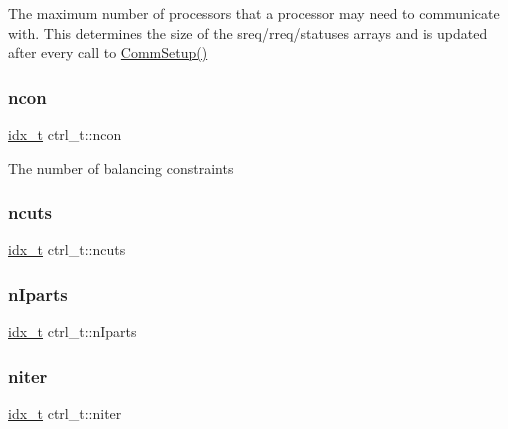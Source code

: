 The maximum number of processors that a processor may need to communicate with. This determines the size of the sreq/rreq/statuses arrays and is updated after every call to \hyperlink{libparmetis_2rename_8h_a8247e54e9e936d99c991d14d3f5ba03a}{Comm\+Setup()} \mbox{\label{structctrl__t_afb1fd1cb311eb4bcefa46a14ef05afa0}} 
\subsubsection{\texorpdfstring{ncon}{ncon}}
{\footnotesize\ttfamily \hyperlink{3rd_party_2parmetis-4_80_83_2metis_2include_2metis_8h_aaa5262be3e700770163401acb0150f52}{idx\+\_\+t} ctrl\+\_\+t\+::ncon}

The number of balancing constraints \mbox{\label{structctrl__t_a40c46fa39e062a9efdc6eaacefe44a8b}} 
\subsubsection{\texorpdfstring{ncuts}{ncuts}}
{\footnotesize\ttfamily \hyperlink{3rd_party_2parmetis-4_80_83_2metis_2include_2metis_8h_aaa5262be3e700770163401acb0150f52}{idx\+\_\+t} ctrl\+\_\+t\+::ncuts}

\mbox{\label{structctrl__t_ad6cb0c7aa46b56d1061fbe2ff8916b72}} 
\subsubsection{\texorpdfstring{n\+Iparts}{nIparts}}
{\footnotesize\ttfamily \hyperlink{3rd_party_2parmetis-4_80_83_2metis_2include_2metis_8h_aaa5262be3e700770163401acb0150f52}{idx\+\_\+t} ctrl\+\_\+t\+::n\+Iparts}

\mbox{\label{structctrl__t_a286168eb06a334afdca8040c58f1c50a}} 
\subsubsection{\texorpdfstring{niter}{niter}}
{\footnotesize\ttfamily \hyperlink{3rd_party_2parmetis-4_80_83_2metis_2include_2metis_8h_aaa5262be3e700770163401acb0150f52}{idx\+\_\+t} ctrl\+\_\+t\+::niter}

